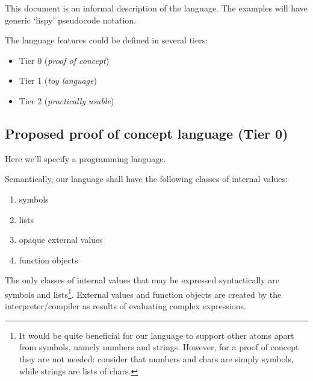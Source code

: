 \documentclass[main.tex]{subfiles}
\begin{document}

This document is an informal description of the language. The examples will
have generic `lispy' pseudocode notation.

The language features could be defined in several tiers:
\begin{itemize}
    \item Tier 0 (\emph{proof of concept})
    \item Tier 1 (\emph{toy language})
    \item Tier 2 (\emph{practically usable})
\end{itemize}

\subsection{Proposed proof of concept language (Tier 0)}

Here we'll specify a programming language.

Semantically, our language shall have the following classes of internal values:
\begin{enumerate}
    \item symbols
    \item lists
    \item opaque external values
    \item function objects
\end{enumerate}

The only classes of internal values that may be expressed syntactically are
symbols and lists\footnote{%
    It would be quite beneficial for our language to
    support other atoms apart from symbols, namely numbers and strings.
    However, for a proof of concept they are not needed: consider that numbers
    and chars are simply symbols, while strings are lists of chars.}.
External values and function objects are created by the interpreter/compiler as
results of evaluating complex expressions.
\end{document}
